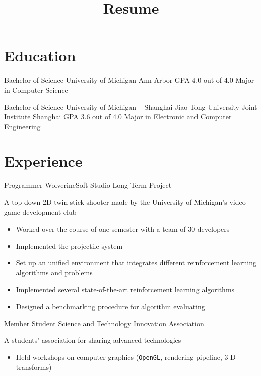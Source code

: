 \documentclass[11pt, a4paper, sans]{moderncv}
\title{Resume}
\begin{document}
\makecvtitle
	
\section{Education}
{Bachelor of Science}
{University of Michigan}
{Ann Arbor}
{GPA 4.0 out of 4.0}
{Major in Computer Science}

{Bachelor of Science}
{University of Michigan -- Shanghai Jiao Tong University Joint Institute}
{Shanghai}
{GPA 3.6 out of 4.0}
{Major in Electronic and Computer Engineering}

\section{Experience}
{Programmer}
{WolverineSoft Studio Long Term Project}
{}{}
{A top-down 2D twin-stick shooter made by the University of Michigan's video game development club
\begin{itemize}
\item Worked over the course of one semester with a team of 30 developers
\item Implemented the projectile system
\end{itemize}}

{
\begin{itemize}
\item Set up an unified environment that integrates different reinforcement learning algorithms and problems
\item Implemented several state-of-the-art reinforcement learning algorithms
\item Designed a benchmarking procedure for algorithm evaluating
\end{itemize}}

{Member}
{Student Science and Technology Innovation Association}
{}{}
{A students' association for sharing advanced technologies
\begin{itemize}
	\item Held workshops on computer graphics (\texttt{OpenGL}, rendering pipeline, 3-D transforms)
\end{itemize}}
\end{document}

